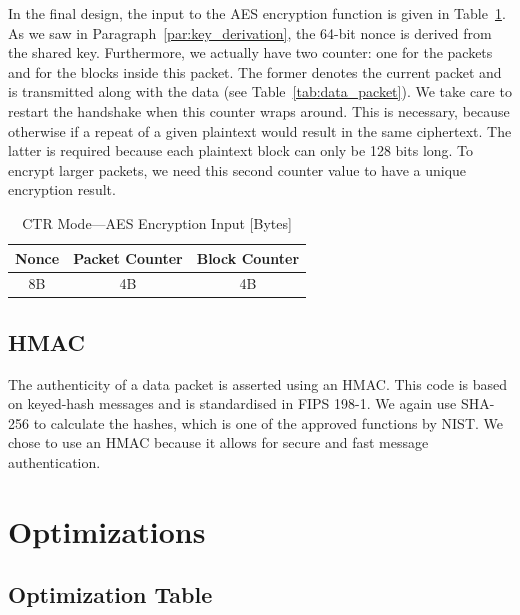 \documentclass[a4paper]{article}
\begin{document}
In the final design, the input to the AES encryption function is given in Table~\ref{tab:ctr_mode_aes_encryption_input}. As we saw in Paragraph~\ref{par:key_derivation}, the 64-bit nonce is derived from the shared key. Furthermore, we actually have two counter: one for the packets and for the blocks inside this packet. The former denotes the current packet and is transmitted along with the data (see Table~\ref{tab:data_packet}). We take care to restart the handshake when this counter wraps around. This is necessary, because otherwise if a repeat of a given plaintext would result in the same ciphertext. The latter is required because each plaintext block can only be 128 bits long. To encrypt larger packets, we need this second counter value to have a unique encryption result.

\begin{table}[h]
    \begin{center}
        \begin{tabular}{| c | c | c |}
            \hline
            Nonce & Packet Counter & Block Counter \\ \hline
            8B & 4B & 4B \\
            \hline
        \end{tabular}
    \end{center}

    \caption{CTR Mode---AES Encryption Input [Bytes]}
    \label{tab:ctr_mode_aes_encryption_input}
\end{table}

\subsection{HMAC}

The authenticity of a data packet is asserted using an HMAC. This code is based on keyed-hash messages and is standardised in FIPS 198-1. We again use SHA-256 to calculate the hashes, which is one of the approved functions by NIST. We chose to use an HMAC because it allows for secure and fast message authentication.

\section{Optimizations}

\subsection{Optimization Table}
\end{document}
